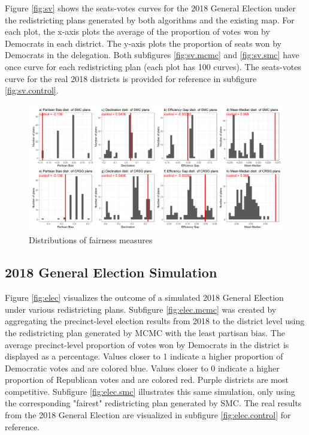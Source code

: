 Figure \ref{fig:sv} shows the seats-votes curves \parencite{katz2020} for the 2018 General Election under the redistricting plans generated by both algorithms and the existing map. For each plot, the x-axis plots the average of the proportion of votes won by Democrats in each district. The y-axis plots the proportion of seats won by Democrats in the delegation. Both subfigures \ref{fig:sv.mcmc} and \ref{fig:sv.smc} have once curve for each redistricting plan (each plot has 100 curves). The seats-votes curve for the real 2018 districts is provided for reference in subfigure \ref{fig:sv.control}.

\begin{landscape}
    \begin{figure}
     \centering
     \includegraphics{img/fair_hist.png}
     \caption{Distributions of fairness measures}
     \label{fig:fair_hist}
    \end{figure}
   \end{landscape}

\subsection{2018 General Election Simulation}


Figure \ref{fig:elec} visualizes the outcome of a simulated 2018 General Election under various redistricting plans. Subfigure \ref{fig:elec.mcmc} was created by aggregating the precinct-level election results from 2018 to the district level using the redistricting plan generated by MCMC with the least partisan bias. The average precinct-level proportion of votes won by Democrats in the district is displayed as a percentage. Values closer to 1 indicate a higher proportion of Democratic votes and are colored blue. Values closer to 0 indicate a higher proportion of Republican votes and are colored red. Purple districts are most competitive. Subfigure \ref{fig:elec.smc} illustrates this same simulation, only using the corresponding "fairest" redistricting plan generated by SMC. The real results from the 2018 General Election are visualized in subfigure \ref{fig:elec.control} for reference. 